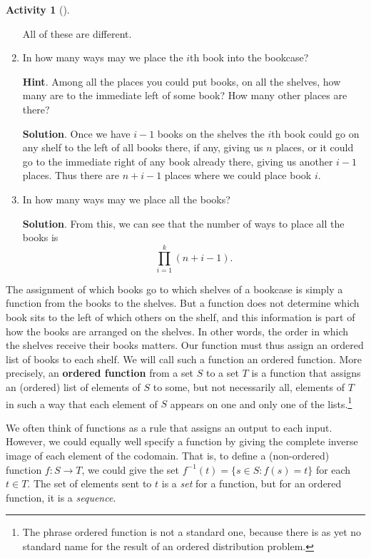 \documentclass[10pt,]{book}
\newcommand{\terminology}[1]{\textbf{#1}}
\theoremstyle{plain}
\theoremstyle{definition}
\theoremstyle{definition}
\theoremstyle{definition}
\newtheorem{activity}[project]{Activity}
\theoremstyle{definition}
\numberwithin{equation}{chapter}
\def\inv{^{-1}}
\def\st{:}
\begin{document}
\begin{activity}[]
\begin{enumerate}[font=\bfseries,label=(\alph*),ref=\alph*]
\hypertarget{p-739}{}%
All of these are different.%
\item\label{task-96} \hypertarget{p-740}{}%
In how many ways may we place the \(i\)th book into the bookcase?%
\par\smallskip%
\noindent\textbf{Hint}.\hypertarget{hint-58}{}\quad%
\hypertarget{p-741}{}%
Among all the places you could put books, on all the shelves, how many are to the immediate left of some book? How many other places are there?%
\par\smallskip%
\noindent\textbf{Solution}.\hypertarget{solution-68}{}\quad%
\hypertarget{p-742}{}%
Once we have \(i-1\) books on the shelves the \(i\)th book could go on any shelf to the left of all books there, if any, giving us \(n\) places, or it could go to the immediate right of any book already there, giving us another \(i-1\) places. Thus there are \(n+i-1\) places where we could place book  \(i\).%
\item\label{task-97} \hypertarget{p-743}{}%
In how many ways may we place all the books?%
\par\smallskip%
\noindent\textbf{Solution}.\hypertarget{solution-69}{}\quad%
\hypertarget{p-744}{}%
From this, we can see that the number of ways to place all the books is%
\begin{equation*}
\prod_{i=1}^k (n+i-1).
\end{equation*}
%
\end{enumerate}
\end{activity}
\hypertarget{p-745}{}%
The assignment of which books go to which shelves of a bookcase is simply a function from the books to the shelves. But a function does not determine which book sits to the left of which others on the shelf, and this information is part of how the books are arranged on the shelves. In other words, the order in which the shelves receive their books matters.  Our function must thus assign an ordered list of books to each shelf. We will call such a function an ordered function. More precisely, an \terminology{ordered function} from a set \(S\) to a set \(T\) is a function that assigns an (ordered) list of elements of \(S\) to some, but not necessarily all, elements of \(T\) in such a way that each element of \(S\) appears on one and only one of the lists.\footnote{The phrase ordered function is not a standard one, because there is as yet no standard name for the result of an ordered distribution problem.\label{fn-6}}%
\par
\hypertarget{p-746}{}%
We often think of functions as a rule that assigns an output to each input.  However, we could equally well specify a function by giving the complete inverse image of each element of the codomain.  That is, to define a (non-ordered) function \(f:S \to T\), we could give the set \(f\inv(t) = \{s \in S \st f(s) = t\}\) for each \(t \in T\).  The set of elements sent to \(t\) is a \emph{set} for a function, but for an ordered function, it is a \emph{sequence}.%
\end{document}
